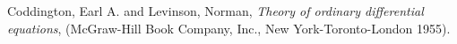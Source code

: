 \documentclass[a4paper,11pt]{article}
\theoremstyle{remark}
\begin{document}
\begin{thebibliography}{10}
{\sc Coddington, Earl A. and Levinson, Norman},
{\it Theory of ordinary differential equations},
(McGraw-Hill Book Company, Inc., New York-Toronto-London 1955).

%
%
%
%
%
%
%
%
%
%
%
%

\end{thebibliography}
\end{document}
